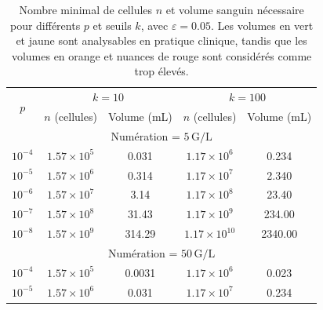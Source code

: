 \begin{table}[H]
    \centering
    \caption{
        Nombre minimal de cellules $n$ et volume sanguin nécessaire pour différents $p$ et seuils $k$, avec $\varepsilon = 0.05$.
        Les volumes en \colorbox{mygreen}{vert} et \colorbox{myyellow}{jaune} sont analysables en pratique clinique, tandis que les
        volumes en \colorbox{myorange}{orange} et nuances de \colorbox{myred}{rouge} sont considérés comme trop élevés.
    }
    \label{tab:valeurs_n_volume}
    \begin{tabular}{c|cc|cc}
        \toprule
        \multirow{2}{*}{$p$} & \multicolumn{2}{c|}{$k = 10$} & \multicolumn{2}{c}{$k = 100$}                                                        \\
                             & $n$ (cellules)                & Volume (mL)                   & $n$ (cellules)        & Volume (mL)                  \\
        \midrule
        \multicolumn{5}{c}{Numération = $5\,\text{G/L}$}                                                                                            \\
        \midrule
        $10^{-4}$            & $1.57 \times 10^{5}$          & \cellcolor{mygreen}0.031      & $1.17 \times 10^{6}$  & \cellcolor{mygreen}0.234     \\
        $10^{-5}$            & $1.57 \times 10^{6}$          & \cellcolor{mygreen}0.314      & $1.17 \times 10^{7}$  & \cellcolor{myyellow}2.340    \\
        $10^{-6}$            & $1.57 \times 10^{7}$          & \cellcolor{myyellow}3.14      & $1.17 \times 10^{8}$  & \cellcolor{myorange}23.40    \\
        $10^{-7}$            & $1.57 \times 10^{8}$          & \cellcolor{myred}31.43        & $1.17 \times 10^{9}$  & \cellcolor{mydarkred}234.00  \\
        $10^{-8}$            & $1.57 \times 10^{9}$          & \cellcolor{mydarkred}314.29   & $1.17 \times 10^{10}$ & \cellcolor{mydeepred}2340.00 \\
        \midrule
        \multicolumn{5}{c}{Numération = $50\,\text{G/L}$}                                                                                           \\
        \midrule
        $10^{-4}$            & $1.57 \times 10^{5}$          & \cellcolor{mygreen}0.0031     & $1.17 \times 10^{6}$  & \cellcolor{mygreen}0.023     \\
        $10^{-5}$            & $1.57 \times 10^{6}$          & \cellcolor{mygreen}0.031      & $1.17 \times 10^{7}$  & \cellcolor{mygreen}0.234     \\

\end{tabular}
\end{table}
